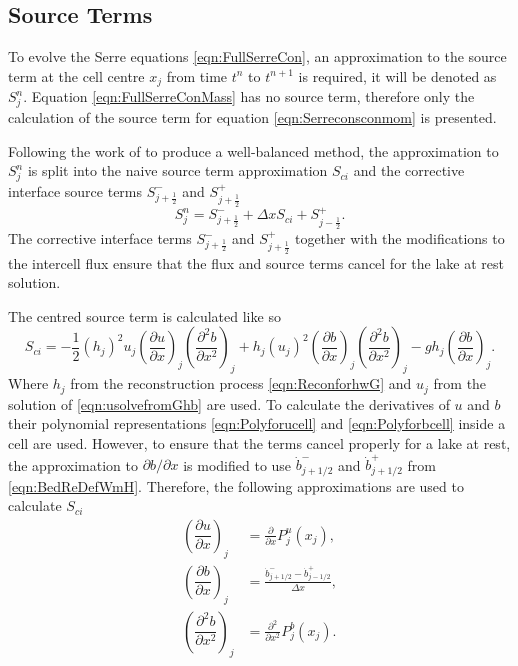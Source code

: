 \subsection{Source Terms}
\label{subsec:SourceTerm}
To evolve the Serre equations \eqref{eqn:FullSerreCon}, an approximation to the source term at the cell centre $x_j$ from time $t^n$ to $t^{n+1}$ is required, it will be denoted as $S^n_j$. Equation \eqref{eqn:FullSerreConMass} has no source term, therefore only the calculation of the source term for equation \eqref{eqn:Serreconsconmom} is presented.

Following the work of \citet{Klein-etal-2004-2050} to produce a well-balanced method, the approximation to $S^n_j$ is split into the naive source term approximation $S_{ci}$ and the corrective interface source terms $S^{-}_{j + \frac{1}{2}}$ and $S^{+}_{j + \frac{1}{2}}$
\begin{equation*}
S^n_j =  S^{-}_{j + \frac{1}{2}} + \Delta x S_{ci} + S^{+}_{j - \frac{1}{2}}.
\end{equation*}
The corrective interface terms $S^{-}_{j + \frac{1}{2}}$ and $S^{+}_{j + \frac{1}{2}}$ together with the modifications to the intercell flux ensure that the flux and source terms cancel for the lake at rest solution. 

The centred source term is calculated like so
\begin{equation*}
 S_{ci} = -\frac{1}{2}\left(h_j\right)^2 {u_j}\left( \frac{\partial {u}}{\partial x} \right)_j \left(\frac{\partial^2 b}{\partial x^2} \right)_j  + h_j \left(u_j\right)^2 \left(\frac{\partial b}{\partial x}\right)_j \left(\frac{\partial^2 b}{\partial x^2}\right)_j - gh_j\left(\frac{\partial b}{\partial x}\right)_j.
\end{equation*}
Where $h_j$ from the reconstruction process \eqref{eqn:ReconforhwG} and $u_j$ from the solution of \eqref{eqn:usolvefromGhb} are used. To calculate the derivatives of $u$ and $b$ their polynomial representations \eqref{eqn:Polyforucell} and \eqref{eqn:Polyforbcell} inside a cell are used. However, to ensure that the terms cancel properly for a lake at rest, the approximation to ${\partial b}/{\partial x}$ is modified to use $\dot{b}^-_{j+1/2}$ and $\dot{b}^+_{j+1/2}$ from \eqref{eqn:BedReDefWmH}. Therefore, the following approximations are used to calculate $S_{ci}$
	\begin{align*}
	\left(\dfrac{\partial {u}}{\partial x} \right)_{j} &= \frac{\partial }{\partial x}P^u_j(x_{j}),  \\
\left(\dfrac{\partial {b}}{\partial x} \right)_{j} &=  \frac{\dot{b}^-_{j+1/2} - \dot{b}^+_{j-1/2}}{\Delta x} , \\	
	\left(\dfrac{\partial^2 {b}}{\partial x^2} \right)_{j} &= \frac{\partial^2 }{\partial x^2}P^b_j(x_{j}).
	\end{align*}

